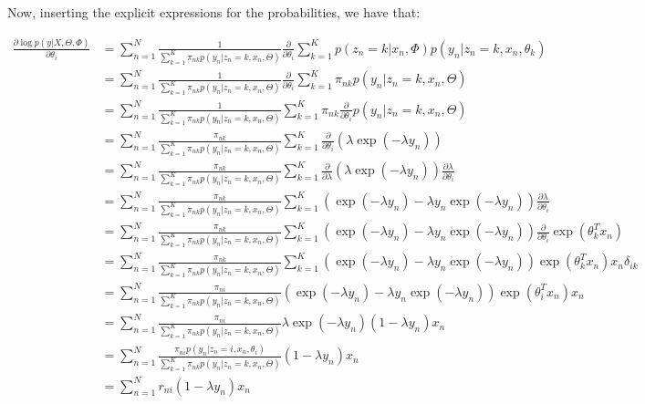 \documentclass[12pt,a4paper,oneside]{paper}
\begin{document}
Now, inserting the explicit expressions for the probabilities, we have that:

\begin{align*}
    \frac{\partial \log p(y | X, \Theta, \Phi)}{\partial \theta_i} &= \sum_{n=1}^{N} \frac{1}{\sum_{k=1}^{K} \pi_{nk} p(y_n | z_n = k, x_n, \Theta)} \frac{\partial}{\partial \theta_i} \sum_{k=1}^{K} p(z_n = k | x_n, \Phi) p(y_n | z_n = k, x_n, \theta_k) \\
    &= \sum_{n=1}^{N} \frac{1}{\sum_{k=1}^{K} \pi_{nk} p(y_n | z_n = k, x_n, \Theta)} \frac{\partial}{\partial \theta_i} \sum_{k=1}^{K} \pi_{nk} p(y_n | z_n = k, x_n, \Theta) \\
    &= \sum_{n=1}^{N} \frac{1}{\sum_{k=1}^{K} \pi_{nk} p(y_n | z_n = k, x_n, \Theta)} \sum_{k=1}^{K} \pi_{nk} \frac{\partial}{\partial \theta_i} p(y_n | z_n = k, x_n, \Theta) \\
    &= \sum_{n=1}^{N} \frac{\pi_{nk}}{\sum_{k=1}^{K} \pi_{nk} p(y_n | z_n = k, x_n, \Theta)} \sum_{k=1}^{K} \frac{\partial}{\partial \theta_i} \left(\lambda \exp(-\lambda y_n) \right) \\
    &= \sum_{n=1}^{N} \frac{\pi_{nk}}{\sum_{k=1}^{K} \pi_{nk} p(y_n | z_n = k, x_n, \Theta)} \sum_{k=1}^{K} \frac{\partial}{\partial \lambda} \left(\lambda \exp(-\lambda y_n) \right) \frac{\partial \lambda}{\partial \theta_i} \\
    &= \sum_{n=1}^{N} \frac{\pi_{nk}}{\sum_{k=1}^{K} \pi_{nk} p(y_n | z_n = k, x_n, \Theta)} \sum_{k=1}^{K} (\exp(-\lambda y_n) - \lambda y_n \exp(-\lambda y_n)) \frac{\partial \lambda}{\partial \theta_i} \\
    &= \sum_{n=1}^{N} \frac{\pi_{nk}}{\sum_{k=1}^{K} \pi_{nk} p(y_n | z_n = k, x_n, \Theta)} \sum_{k=1}^{K} (\exp(-\lambda y_n) - \lambda y_n \exp(-\lambda y_n)) \frac{\partial}{\partial \theta_i} \exp(\theta_k^T x_n) \\
    &= \sum_{n=1}^{N} \frac{\pi_{nk}}{\sum_{k=1}^{K} \pi_{nk} p(y_n | z_n = k, x_n, \Theta)} \sum_{k=1}^{K} (\exp(-\lambda y_n) - \lambda y_n \exp(-\lambda y_n)) \exp(\theta_k^T x_n) x_n \delta_{ik} \\
    &= \sum_{n=1}^{N} \frac{\pi_{ni}}{\sum_{k=1}^{K} \pi_{nk} p(y_n | z_n = k, x_n, \Theta)} (\exp(-\lambda y_n) - \lambda y_n \exp(-\lambda y_n)) \exp(\theta_i^T x_n) x_n \\
    &= \sum_{n=1}^{N} \frac{\pi_{ni}}{\sum_{k=1}^{K} \pi_{nk} p(y_n | z_n = k, x_n, \Theta)} \lambda \exp(-\lambda y_n) (1 - \lambda y_n) x_n \\
    &= \sum_{n=1}^{N} \frac{\pi_{ni} p(y_n | z_n = i, x_n, \theta_i)}{\sum_{k=1}^{K} \pi_{nk} p(y_n | z_n = k, x_n, \Theta)} (1 - \lambda y_n) x_n \\
    &= \sum_{n=1}^{N} r_{ni} (1 - \lambda y_n) x_n
\end{align*}
\end{document}
